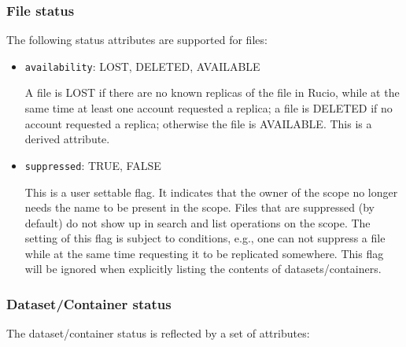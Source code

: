 \documentclass{atlasnote}
\begin{document}
\subsubsection{File status}
\label{sec:file-status}

The following status attributes are supported for files:

\begin{itemize}
\item{} \texttt{availability}: LOST, DELETED, AVAILABLE

A file is LOST if there are no known replicas of the file in Rucio, while at the same time at least one account requested a replica; a file is DELETED if no account requested a replica; otherwise the file is AVAILABLE. This is a derived attribute.

\item{} \texttt{suppressed}: TRUE, FALSE

This is a user settable flag. It indicates that the owner of the scope no longer needs the name to be present in the scope. Files that are suppressed (by default) do not show up in search and list operations on the scope. The setting of this flag is subject to conditions, e.g., one can not suppress a file while at the same time requesting it to be replicated somewhere. This flag will be ignored when explicitly listing the contents of datasets/containers.
\end{itemize}

\subsubsection{Dataset/Container status}
\label{sec:dataset-container-status}

\label{sec:status}
The dataset/container status is reflected by a set of attributes:
\end{document}
